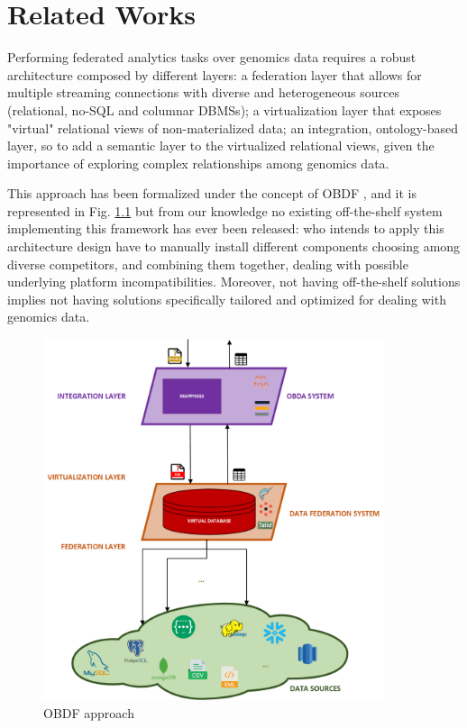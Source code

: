 
\chapter{Related Works}
\label{chp:related}

Performing federated analytics tasks over genomics data requires a robust architecture composed by different layers: a federation layer that allows for multiple streaming connections with diverse and heterogeneous sources (relational, no-SQL and columnar \ac{DBMS}s); a virtualization layer that exposes "virtual" relational views of non-materialized data; an integration, ontology-based layer, so to add a semantic layer to the virtualized relational views, given the importance of exploring complex relationships among genomics data.

This approach has been formalized under the concept of \ac{OBDF} \cite{DBLP:conf/icde/GuCPLMX24}, and it is represented in Fig. \ref{fig:obdf} but from our knowledge no existing off-the-shelf system implementing this framework has ever been released: who intends to apply this architecture design have to manually install different components choosing among diverse competitors, and combining them together, dealing with possible underlying platform incompatibilities. Moreover, not having off-the-shelf solutions implies not having solutions specifically tailored and optimized for dealing with genomics data.

\begin{figure}[ht]
    \centering
    \includegraphics[width=10cm]{res/Drawing4.png}
    \caption{OBDF approach}
    \label{fig:obdf}
\end{figure}